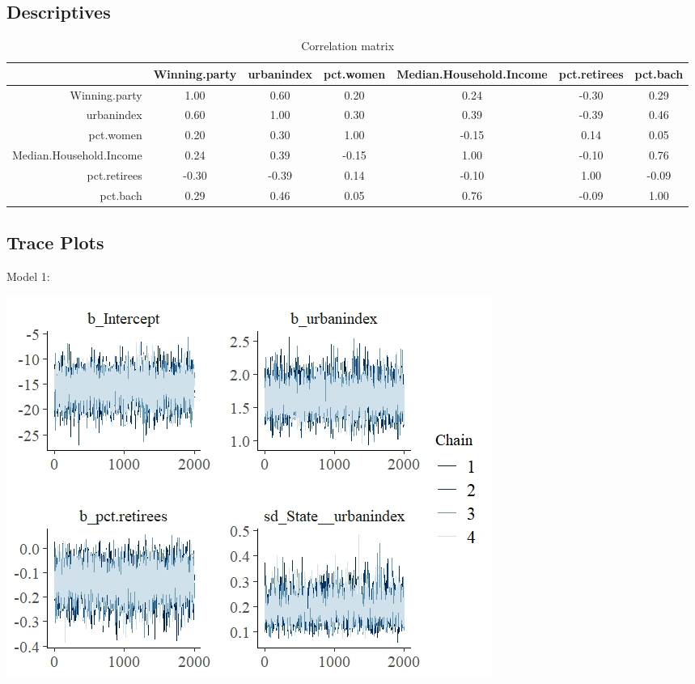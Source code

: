\documentclass[12pt]{article}
\begin{document}
\subsection*{Descriptives}

\begin{table}[ht]
	\centering
	\begin{adjustbox}{max width=\textwidth}
	\begin{tabular}{rcccccc}
		\hline
		& Winning.party & urbanindex & pct.women & Median.Household.Income & pct.retirees & pct.bach \\ 
		\hline
		Winning.party & 1.00 & 0.60 & 0.20 & 0.24 & -0.30 & 0.29 \\ 
		urbanindex & 0.60 & 1.00 & 0.30 & 0.39 & -0.39 & 0.46 \\ 
		pct.women & 0.20 & 0.30 & 1.00 & -0.15 & 0.14 & 0.05 \\ 
		Median.Household.Income & 0.24 & 0.39 & -0.15 & 1.00 & -0.10 & 0.76 \\ 
		pct.retirees & -0.30 & -0.39 & 0.14 & -0.10 & 1.00 & -0.09 \\ 
		pct.bach & 0.29 & 0.46 & 0.05 & 0.76 & -0.09 & 1.00 \\ 
		\hline
	\end{tabular}
	\end{adjustbox}
	\caption{Correlation matrix}
	\label{}
\end{table}











\subsection*{Trace Plots}

Model 1:

\includegraphics[scale = 1.25]{trace_plots/trace_model1.jpeg}
\end{document}
